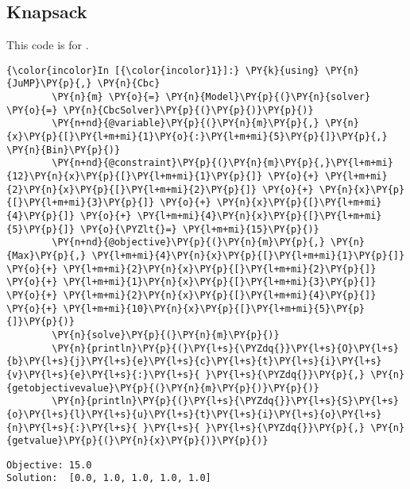 \subsection{Knapsack}
\label{code:knapsack}
This code is for .

    \begin{Verbatim}[commandchars=\\\{\}]
{\color{incolor}In [{\color{incolor}1}]:} \PY{k}{using} \PY{n}{JuMP}\PY{p}{,} \PY{n}{Cbc}
        \PY{n}{m} \PY{o}{=} \PY{n}{Model}\PY{p}{(}\PY{n}{solver} \PY{o}{=} \PY{n}{CbcSolver}\PY{p}{(}\PY{p}{)}\PY{p}{)}
        \PY{n+nd}{@variable}\PY{p}{(}\PY{n}{m}\PY{p}{,} \PY{n}{x}\PY{p}{[}\PY{l+m+mi}{1}\PY{o}{:}\PY{l+m+mi}{5}\PY{p}{]}\PY{p}{,} \PY{n}{Bin}\PY{p}{)}
        \PY{n+nd}{@constraint}\PY{p}{(}\PY{n}{m}\PY{p}{,}\PY{l+m+mi}{12}\PY{n}{x}\PY{p}{[}\PY{l+m+mi}{1}\PY{p}{]} \PY{o}{+} \PY{l+m+mi}{2}\PY{n}{x}\PY{p}{[}\PY{l+m+mi}{2}\PY{p}{]} \PY{o}{+} \PY{n}{x}\PY{p}{[}\PY{l+m+mi}{3}\PY{p}{]} \PY{o}{+} \PY{n}{x}\PY{p}{[}\PY{l+m+mi}{4}\PY{p}{]} \PY{o}{+} \PY{l+m+mi}{4}\PY{n}{x}\PY{p}{[}\PY{l+m+mi}{5}\PY{p}{]} \PY{o}{\PYZlt{}=} \PY{l+m+mi}{15}\PY{p}{)}
        \PY{n+nd}{@objective}\PY{p}{(}\PY{n}{m}\PY{p}{,} \PY{n}{Max}\PY{p}{,} \PY{l+m+mi}{4}\PY{n}{x}\PY{p}{[}\PY{l+m+mi}{1}\PY{p}{]} \PY{o}{+} \PY{l+m+mi}{2}\PY{n}{x}\PY{p}{[}\PY{l+m+mi}{2}\PY{p}{]} \PY{o}{+} \PY{l+m+mi}{1}\PY{n}{x}\PY{p}{[}\PY{l+m+mi}{3}\PY{p}{]} \PY{o}{+} \PY{l+m+mi}{2}\PY{n}{x}\PY{p}{[}\PY{l+m+mi}{4}\PY{p}{]} \PY{o}{+} \PY{l+m+mi}{10}\PY{n}{x}\PY{p}{[}\PY{l+m+mi}{5}\PY{p}{]}\PY{p}{)}
        \PY{n}{solve}\PY{p}{(}\PY{n}{m}\PY{p}{)}
        \PY{n}{println}\PY{p}{(}\PY{l+s}{\PYZdq{}}\PY{l+s}{O}\PY{l+s}{b}\PY{l+s}{j}\PY{l+s}{e}\PY{l+s}{c}\PY{l+s}{t}\PY{l+s}{i}\PY{l+s}{v}\PY{l+s}{e}\PY{l+s}{:}\PY{l+s}{ }\PY{l+s}{\PYZdq{}}\PY{p}{,} \PY{n}{getobjectivevalue}\PY{p}{(}\PY{n}{m}\PY{p}{)}\PY{p}{)}
        \PY{n}{println}\PY{p}{(}\PY{l+s}{\PYZdq{}}\PY{l+s}{S}\PY{l+s}{o}\PY{l+s}{l}\PY{l+s}{u}\PY{l+s}{t}\PY{l+s}{i}\PY{l+s}{o}\PY{l+s}{n}\PY{l+s}{:}\PY{l+s}{ }\PY{l+s}{ }\PY{l+s}{\PYZdq{}}\PY{p}{,} \PY{n}{getvalue}\PY{p}{(}\PY{n}{x}\PY{p}{)}\PY{p}{)}
\end{Verbatim}


    \begin{Verbatim}[commandchars=\\\{\}]
Objective: 15.0
Solution:  [0.0, 1.0, 1.0, 1.0, 1.0]

    \end{Verbatim}

